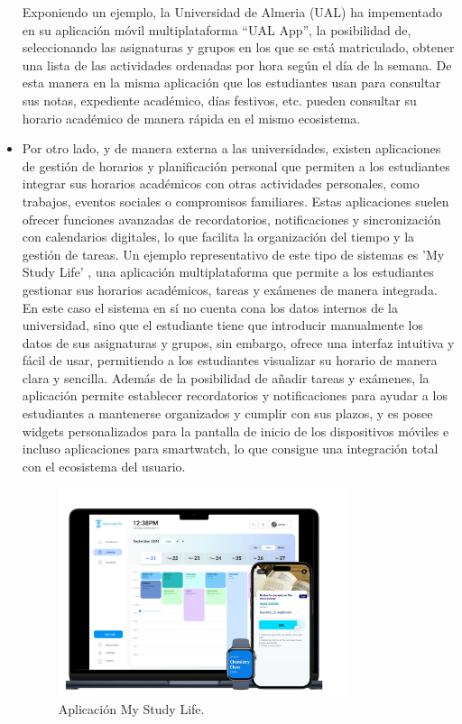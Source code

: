 \begin{itemize}
      Exponiendo un ejemplo, la Universidad de Almeria (UAL) ha impementado en su aplicación móvil multiplataforma ``UAL App'', la posibilidad de, seleccionando las asignaturas y grupos en los que se está matriculado, obtener
      una lista de las actividades ordenadas por hora según el día de la semana.
      \newline
      De esta manera en la misma aplicación que los estudiantes usan para consultar sus notas, expediente académico, días festivos, etc. pueden consultar su horario académico de manera rápida en el mismo ecosistema.

      \item Por otro lado, y de manera externa a las universidades, existen aplicaciones de gestión de horarios y planificación personal que permiten a los estudiantes integrar sus horarios académicos con otras actividades personales, como trabajos, eventos sociales o compromisos familiares. 
      \newline\newline
      Estas aplicaciones suelen ofrecer funciones avanzadas de recordatorios, notificaciones y sincronización con calendarios digitales, lo que facilita la organización del tiempo y la gestión de tareas.
      Un ejemplo representativo de este tipo de sistemas es 'My Study Life'  \cite{webMyStudyLife}, una aplicación multiplataforma que permite a los estudiantes gestionar sus horarios académicos, tareas y exámenes de manera integrada. En este caso el sistema en sí no cuenta cona los datos internos de la universidad, sino que el estudiante tiene que introducir manualmente los datos de sus asignaturas y grupos, sin embargo, ofrece una interfaz intuitiva y fácil de usar, permitiendo a los estudiantes visualizar su horario de manera clara y sencilla.
      Además de la posibilidad de añadir tareas y exámenes, la aplicación permite establecer recordatorios y notificaciones para ayudar a los estudiantes a mantenerse organizados y cumplir con sus plazos, y es posee widgets personalizados para la pantalla de inicio de los dispositivos móviles e incluso aplicaciones para smartwatch, lo que consigue una integración total con el ecosistema del usuario.

      \begin{figure}[H]
            \centering
            \includegraphics[width=0.8\textwidth]{figures/03_my_study_life.png}
            \caption{Aplicación My Study Life.}
            \label{fig:mystudylife}
      \end{figure}


\end{itemize}

